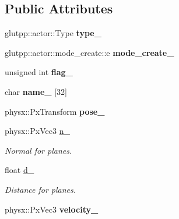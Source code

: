 \subsection*{\-Public \-Attributes}
\begin{DoxyCompactItemize}
\item 
\hypertarget{classglutpp_1_1actor_1_1raw_a3f0d9e3fb83a5514b1e282c5d2232772}{glutpp\-::actor\-::\-Type {\bfseries type\-\_\-}}\label{classglutpp_1_1actor_1_1raw_a3f0d9e3fb83a5514b1e282c5d2232772}

\item 
\hypertarget{classglutpp_1_1actor_1_1raw_acec042d2aaa59655cdb23df1a82552ef}{glutpp\-::actor\-::mode\-\_\-create\-::e {\bfseries mode\-\_\-create\-\_\-}}\label{classglutpp_1_1actor_1_1raw_acec042d2aaa59655cdb23df1a82552ef}

\item 
\hypertarget{classglutpp_1_1actor_1_1raw_a55d3f6c19e283dbea4b1b936c62b7b93}{unsigned int {\bfseries flag\-\_\-}}\label{classglutpp_1_1actor_1_1raw_a55d3f6c19e283dbea4b1b936c62b7b93}

\item 
\hypertarget{classglutpp_1_1actor_1_1raw_ab8f930c6009c82262297bbbe44438028}{char {\bfseries name\-\_\-} \mbox{[}32\mbox{]}}\label{classglutpp_1_1actor_1_1raw_ab8f930c6009c82262297bbbe44438028}

\item 
\hypertarget{classglutpp_1_1actor_1_1raw_af49122ec69498d01e13400e3d2cbddb4}{physx\-::\-Px\-Transform {\bfseries pose\-\_\-}}\label{classglutpp_1_1actor_1_1raw_af49122ec69498d01e13400e3d2cbddb4}

\item 
\hypertarget{classglutpp_1_1actor_1_1raw_ade5f796dbc4dcaf58244aa3356570da2}{physx\-::\-Px\-Vec3 \hyperlink{classglutpp_1_1actor_1_1raw_ade5f796dbc4dcaf58244aa3356570da2}{n\-\_\-}}\label{classglutpp_1_1actor_1_1raw_ade5f796dbc4dcaf58244aa3356570da2}

\begin{DoxyCompactList}\small\item\em \-Normal for planes. \end{DoxyCompactList}\item 
\hypertarget{classglutpp_1_1actor_1_1raw_a25767c30241b29e73e09e68b35c2a8f2}{float \hyperlink{classglutpp_1_1actor_1_1raw_a25767c30241b29e73e09e68b35c2a8f2}{d\-\_\-}}\label{classglutpp_1_1actor_1_1raw_a25767c30241b29e73e09e68b35c2a8f2}

\begin{DoxyCompactList}\small\item\em \-Distance for planes. \end{DoxyCompactList}\item 
\hypertarget{classglutpp_1_1actor_1_1raw_a7fb44d5d291b11cdb171ce3b48380672}{physx\-::\-Px\-Vec3 {\bfseries velocity\-\_\-}}\label{classglutpp_1_1actor_1_1raw_a7fb44d5d291b11cdb171ce3b48380672}


\end{DoxyCompactItemize}
